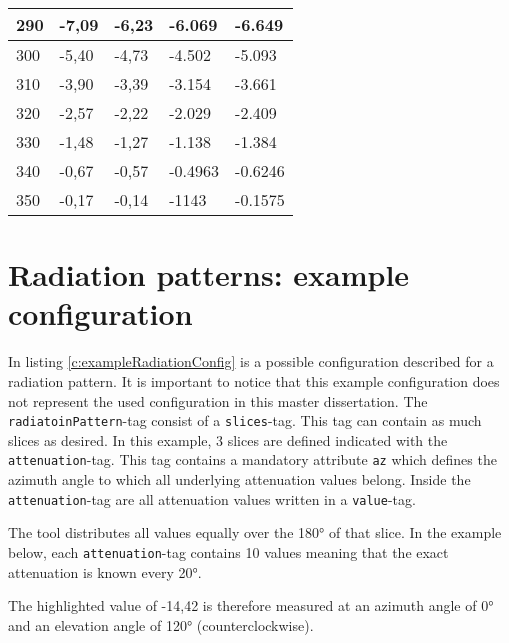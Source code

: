 \begin{table*}[!ht]
\begin{tabular}{|l|l|l|l|l|}
290 & -7,09 & -6,23 & -6.069 & -6.649 \\ \hline
300 & -5,40 & -4,73 & -4.502 & -5.093 \\ \hline
310 & -3,90 & -3,39 & -3.154 & -3.661 \\ \hline
320 & -2,57 & -2,22 & -2.029 & -2.409 \\ \hline
330 & -1,48 & -1,27 & -1.138 & -1.384 \\ \hline
340 & -0,67 & -0,57 & -0.4963 & -0.6246 \\ \hline
350 & -0,17 & -0,14 & -1143 & -0.1575 \\ \hline
\end{tabular}
\label{tab:datasheetRadiation}
\end{table*}



\chapter{Radiation patterns: example configuration}

In listing \ref{c:exampleRadiationConfig} is a possible configuration described for a radiation pattern.
It is important to notice that this example configuration does not represent the used configuration in this master dissertation.
The \verb|radiatoinPattern|-tag consist of a \verb|slices|-tag. This tag can contain as much slices as desired.
In this example, 3 slices are defined indicated with the \verb|attenuation|-tag. This tag contains a mandatory attribute \verb|az| 
which defines the azimuth angle to which all underlying attenuation values belong.
Inside the \verb|attenuation|-tag are all attenuation values written in a \verb|value|-tag.

The tool distributes all values equally over the \ang{180} of that slice. In the example below, each \verb|attenuation|-tag contains 10 values
meaning that the exact attenuation is known every \ang{20}.

The highlighted value of -14,42 is therefore measured at an azimuth angle of \ang{0} and an elevation angle of \ang{120} (counterclockwise).

